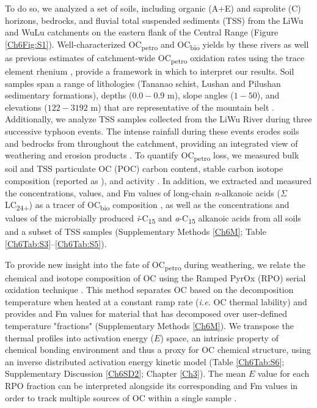 To do so, we analyzed a set of soils, including organic (A+E) and saprolite (C) horizons, bedrocks, and fluvial total suspended sediments (TSS) from the LiWu and WuLu catchments on the eastern flank of the Central Range (Figure \ref{Ch6Fig:S1}). Well-characterized OC\textsubscript{petro} and OC\textsubscript{bio} yields by these rivers \citep{Hilton:2008fo,Hilton:2010cg,Hilton:2011jw,Hilton:2012dt} as well as previous estimates of catchment-wide OC\textsubscript{petro} oxidation rates using the trace element rhenium \citep{Hilton:2014dh}, provide a framework in which to interpret our results. Soil samples span a range of lithologies (Tananao schist, Lushan and Pilushan sedimentary formations), depths ($0.0 - 0.9$ m), slope angles ($1 - 50$\textdegree), and elevations ($122 - 3192$ m) that are representative of the mountain belt \citep{Hilton:2013kq}. Additionally, we analyze TSS samples collected from the LiWu River during three successive typhoon events. The intense rainfall during these events erodes soils and bedrocks from throughout the catchment, providing an integrated view of weathering and erosion products \citep{Hilton:2010cg}. To quantify OC\textsubscript{petro} loss, we measured bulk soil and TSS particulate OC (POC) carbon content, stable carbon isotope composition (reported as ), and  activity \citep[reported as fraction modern (Fm) following][Table \ref{Ch6Tab:S1}--\ref{Ch6Tab:S2}]{Stuiver:1977uh}. In addition, we extracted and measured the concentrations,  values, and Fm values of long-chain \textit{n}-alkanoic acids ($\Sigma$LC\textsubscript{24+}) as a tracer of OC\textsubscript{bio} composition \citep{Eglinton:1967uz}, as well as the concentrations and  values of the microbially produced \textit{i}-C\textsubscript{15} and \textit{a}-C\textsubscript{15} alkanoic acids \citep{Bardgett:2007eb} from all soils and a subset of TSS samples (Supplementary Methods \ref{Ch6M}; Table \ref{Ch6Tab:S3}--\ref{Ch6Tab:S5}).

To provide new insight into the fate of OC\textsubscript{petro} during weathering, we relate the chemical and isotope composition of OC using the Ramped PyrOx (RPO) serial oxidation technique \citep{Rosenheim:2008ed,Rosenheim:2012kh}. This method separates OC based on the decomposition temperature when heated at a constant ramp rate (\textit{i.e.} OC thermal lability) and provides  and Fm values for material that has decomposed over user-defined temperature "fractions" (Supplementary Methods \ref{Ch6M}). We transpose the thermal profiles into activation energy ($E$) space, an intrinsic property of chemical bonding environment and thus a proxy for OC chemical structure, using an inverse distributed activation energy kinetic model (Table \ref{Ch6Tab:S6}; Supplementary Discussion \ref{Ch6SD2}; Chapter \ref{Ch3}). The mean $E$ value for each RPO fraction can be interpreted alongside its corresponding  and Fm values in order to track multiple sources of OC within a single sample \citep{Rosenheim:2008ed,Rosenheim:2012kh}.

